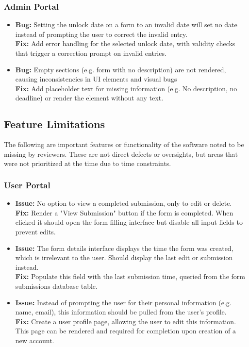 \documentclass[12pt, titlepage]{article}
\begin{document}
\subsubsection{Admin Portal}
\begin{itemize}
    \item
    \textbf{Bug:} Setting the unlock date on a form to an invalid date will set no date instead of prompting the user to correct the invalid entry.
    \\
    \textbf{Fix:} Add error handling for the selected unlock date, with validity checks that trigger a correction prompt on invalid entries.
    \item
    \textbf{Bug:} Empty sections (e.g. form with no description) are not rendered, causing inconsistencies in UI elements and visual bugs
    \\
    \textbf{Fix:} Add placeholder text for missing information (e.g. No description, no deadline) or render the element without any text.
\end{itemize}

\subsection{Feature Limitations}

The following are important features or functionality of the software noted to be missing by reviewers. These are not direct defects or oversights, but areas that were not prioritized at the time due to time constraints.

\subsubsection{User Portal}
\begin{itemize}
    \item
    \textbf{Issue:} No option to view a completed submission, only to edit or delete.
    \\
    \textbf{Fix:} Render a "View Submission" button if the form is completed. When clicked it should open the form filling interface but disable all input fields to prevent edits.
    \item
    \textbf{Issue:} The form details interface displays the time the form was created, which is irrelevant to the user. Should display the last edit or submission instead.
    \\
    \textbf{Fix:} Populate this field with the last submission time, queried from the form submissions database table.
    \item
    \textbf{Issue:} Instead of prompting the user for their personal information (e.g. name, email), this information should be pulled from the user's profile.
    \\
    \textbf{Fix:} Create a user profile page, allowing the user to edit this information. This page can be rendered and required for completion upon creation of a new account.
\end{itemize}
\end{document}

